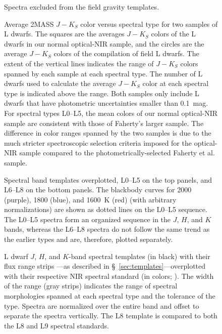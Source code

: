 \documentclass[12pt,preprint]{aastex}
\begin{document}
\begin{figure}
	\caption{Spectra excluded from the field gravity templates.}
	\label{fig:field_excluded}
\end{figure}

\begin{figure}
		\caption{Average 2MASS $J-K_S$ color versus spectral type for two samples of L dwarfs. The squares are the averages $J-K_S$ colors of the L dwarfs in our normal optical-NIR sample, and the circles are the average $J-K_S$ colors of the \citet{Faherty13_0355} compilation of field L dwarfs. The extent of the vertical lines indicates the range of $J-K_S$ colors spanned by each sample at each spectral type. The number of L dwarfs used to calculate the average $J-K_S$ color at each spectral type is indicated above the range. Both samples only include L dwarfs that have photometric uncertainties smaller than 0.1~mag. For spectral types L0--L5, the mean colors of our normal optical-NIR sample are consistent with those of Faherty's larger sample. The difference in color ranges spanned by the two samples is due to the much stricter spectroscopic selection criteria imposed for the optical-NIR sample compared to the photometrically-selected Faherty et al. sample. 
}
	\label{fig:JK_colors_F13}
\end{figure}

\begin{figure}
	\caption{Spectral band templates overplotted, L0--L5 on the top panels, and L6--L8 on the bottom panels. The blackbody curves for 2000 (purple), 1800 (blue), and 1600~K (red) (with arbitrary normalizations) are shown as dotted lines on the L0--L5 sequence. The L0--L5 spectra form an organized sequence in the $J$, $H$, and $K$ bands, whereas the L6--L8 spectra do not follow the same trend as the earlier types and are, therefore, plotted separately.}
	\label{fig:spec_sequence}
\end{figure}


\begin{figure}
		\caption{
	L dwarf $J$, $H$, and $K$-band spectral templates (in black) with their flux range strips ---as described in \S~\ref{sec:templates}---overplotted with their respective NIR spectral standard (in colors; \cite{Kirkpatrick10}). 
	The width of the range (gray strips) indicates the range of spectral morphologies spanned at each spectral type and the tolerance of the type.
	Spectra are normalized over the entire band and offset to separate the spectra vertically.
	The L8 template is compared to both the L8 and L9 spectral standards. }
	\label{fig:templates-stds}
\end{figure}
\end{document}
